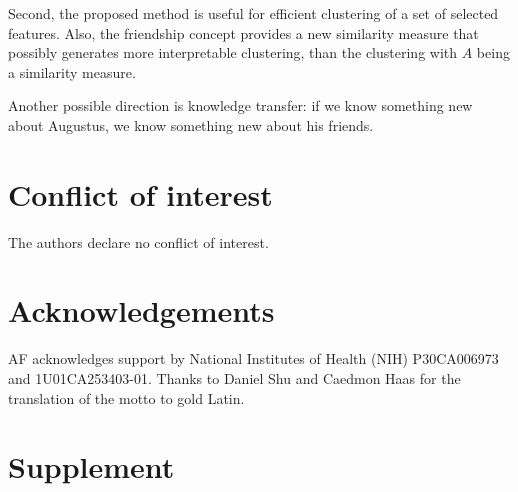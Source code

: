 \documentclass{llncs}
\begin{document}
Second, the proposed method is useful for efficient clustering of a set of selected features. Also, the friendship concept provides a new similarity measure that possibly generates more interpretable clustering, than the clustering with $A$ being a similarity measure.

Another possible direction is knowledge transfer: if we know something new about Augustus, we know something new about his friends. 
\subsection{}




\section{Conflict of interest}
The authors declare no conflict of interest.

\section{Acknowledgements}
AF acknowledges support by National Institutes of Health (NIH) P30CA006973 and 1U01CA253403-01.
Thanks to Daniel Shu and Caedmon Haas for the translation of the motto to gold Latin. 





\newcommand{\beginsupplement}{%
 \setcounter{table}{0}
 \renewcommand{\thetable}{S\arabic{table}}%
 \setcounter{figure}{0}
 \renewcommand{\thefigure}{S\arabic{figure}}
 \setcounter{equation}{0}
 \renewcommand{\theequation}{S\arabic{equation}}%
 }

\newpage
\section*{Supplement}
\beginsupplement
\end{document}

